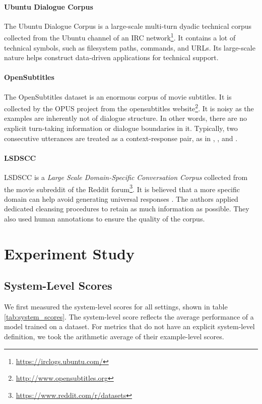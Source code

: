 \documentclass[conference]{IEEEtran}
\begin{document}
\paragraph{Ubuntu Dialogue Corpus}
The Ubuntu Dialogue Corpus \cite{ubuntu_corpus} is a large-scale multi-turn dyadic technical corpus collected from the Ubuntu channel of an IRC network\footnote{\url{https://irclogs.ubuntu.com/}}. It contains a lot of technical symbols, such as filesystem paths, commands, and URLs. Its large-scale nature helps construct data-driven applications for technical support.

\paragraph{OpenSubtitles}
The OpenSubtitles dataset \cite{opensub} is an enormous corpus of movie subtitles. It is collected by the OPUS project \cite{OPUS} from the opensubtitles website\footnote{\url{http://www.opensubtitles.org}}. It is noisy as the examples are inherently not of dialogue structure. In other words, there are no explicit turn-taking information or dialogue boundaries in it. Typically, two consecutive utterances are treated as a context-response pair, as in \cite{GoogleChatbot}, \cite{MMI}, and \cite{persona}.

\paragraph{LSDSCC}
LSDSCC \cite{LSDSCC} is a \emph{Large Scale Domain-Specific Conversation Corpus} collected from the movie subreddit of the Reddit forum\footnote{\url{https://www.reddit.com/r/datasets}}. It is believed that a more specific domain can help avoid generating universal responses \cite{LSDSCC}. The authors applied dedicated cleansing procedures to retain as much information as possible. They also used human annotations to ensure the quality of the corpus.

\section{Experiment Study}
\subsection{System-Level Scores}

We first measured the system-level scores for all settings, shown in table \ref{tab:system_scores}. The system-level score reflects the average performance of a model trained on a dataset. For metrics that do not have an explicit system-level definition, we took the arithmetic average of their example-level scores.
\end{document}
